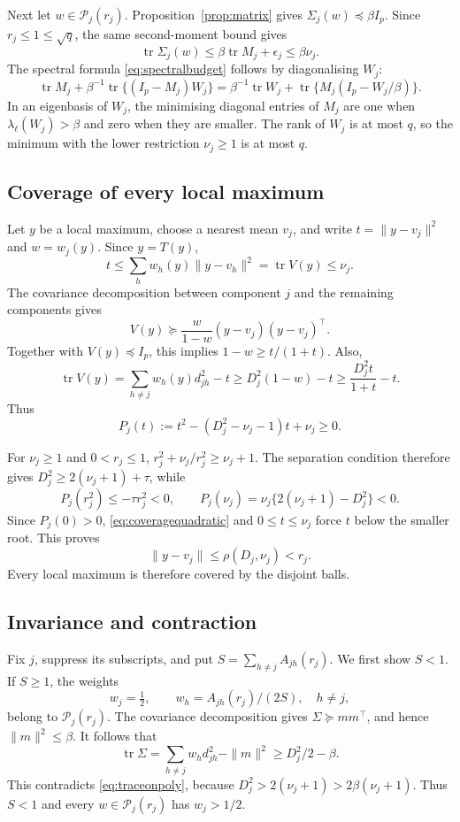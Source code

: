 \documentclass[12pt,a4paper]{article}
\theoremstyle{remark}
\DeclareMathOperator{\tr}{tr}
\begin{document}
Next let $w\in\mathcal P_j(r_j)$. Proposition~\ref{prop:matrix} gives $\Sigma_j(w)\preceq\beta I_p$. Since $r_j\le1\le\sqrt q$, the same second-moment bound gives
\begin{equation}\label{eq:traceonpoly}
 \tr\Sigma_j(w)
 \le\beta\tr M_j+\epsilon_j
 \le\beta\nu_j.
\end{equation}
The spectral formula \eqref{eq:spectralbudget} follows by diagonalising $W_j$:
\[
 \tr M_j+\beta^{-1}\tr\{(I_p-M_j)W_j\}
 =\beta^{-1}\tr W_j+\tr\{M_j(I_p-W_j/\beta)\}.
\]
In an eigenbasis of $W_j$, the minimising diagonal entries of $M_j$ are one when $\lambda_\ell(W_j)>\beta$ and zero when they are smaller. The rank of $W_j$ is at most $q$, so the minimum with the lower restriction $\nu_j\ge1$ is at most $q$.

\subsection{Coverage of every local maximum}

Let $y$ be a local maximum, choose a nearest mean $v_j$, and write
$t=\|y-v_j\|^2$ and $w=w_j(y)$. Since $y=T(y)$,
\[
 t\le\sum_hw_h(y)\|y-v_h\|^2=\tr V(y)\le\nu_j.
\]
The covariance decomposition between component $j$ and the remaining components gives
\[
 V(y)\succeq\frac{w}{1-w}(y-v_j)(y-v_j)^\top.
\]
Together with $V(y)\preceq I_p$, this implies
$1-w\ge t/(1+t)$. Also,
\[
 \tr V(y)=\sum_{h\ne j}w_h(y)d_{jh}^2-t
 \ge D_j^2(1-w)-t
 \ge\frac{D_j^2t}{1+t}-t.
\]
Thus
\begin{equation}\label{eq:coveragequadratic}
 P_j(t):=t^2-(D_j^2-\nu_j-1)t+\nu_j\ge0.
\end{equation}

For $\nu_j\ge1$ and $0<r_j\le1$,
$r_j^2+\nu_j/r_j^2\ge\nu_j+1$. The separation condition therefore gives
$D_j^2\ge2(\nu_j+1)+\tau$, while
\[
 P_j(r_j^2)\le-\tau r_j^2<0,\qquad
 P_j(\nu_j)=\nu_j\{2(\nu_j+1)-D_j^2\}<0.
\]
Since $P_j(0)>0$, \eqref{eq:coveragequadratic} and $0\le t\le\nu_j$ force $t$ below the smaller root. This proves
\[
 \|y-v_j\|\le\rho(D_j,\nu_j)<r_j.
\]
Every local maximum is therefore covered by the disjoint balls.

\subsection{Invariance and contraction}

Fix $j$, suppress its subscripts, and put $S=\sum_{h\ne j}A_{jh}(r_j)$. We first show $S<1$. If $S\ge1$, the weights
\[
 w_j=\tfrac12,\qquad w_h=A_{jh}(r_j)/(2S),\quad h\ne j,
\]
belong to $\mathcal P_j(r_j)$. The covariance decomposition gives $\Sigma\succeq mm^\top$, and hence $\|m\|^2\le\beta$. It follows that
\[
 \tr\Sigma=\sum_{h\ne j}w_hd_{jh}^2-\|m\|^2
           \ge D_j^2/2-\beta.
\]
This contradicts \eqref{eq:traceonpoly}, because
$D_j^2>2(\nu_j+1)>2\beta(\nu_j+1)$. Thus $S<1$ and every $w\in\mathcal P_j(r_j)$ has $w_j>1/2$.
\end{document}
